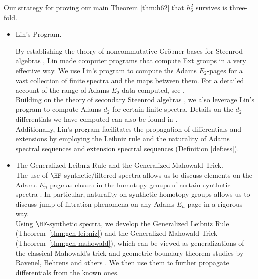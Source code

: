 Our strategy for proving our main Theorem \ref{thm:h62} that $h_6^2$ survives is three-fold. 

\begin{itemize}
    \item Lin's Program.

    \noindent By establishing the theory of noncommutative Gr\"obner bases for Steenrod algebras \cite{LinGrobner}, Lin made computer programs that compute Ext groups in a very effective way. We use Lin's program to compute the Adams $E_2$-pages for a vast collection of finite spectra and the maps between them. For a detailed account of the range of Adams $E_2$ data computed, see \cite{LWXMachine}.\\
    
    \noindent Building on the theory of secondary Steenrod algebras \cite{BJ, Nassau, Chua}, we also leverage Lin’s program to compute Adams $d_2$-for certain finite spectra. Details on the $d_2$-differentials we have computed can also be found in \cite{LWXMachine}.\\
    
    \noindent Additionally, Lin’s program facilitates the propagation of differentials and extensions by employing the Leibniz rule and the naturality of Adams spectral sequences and extension spectral sequences (Definition \ref{def:ess}). \\

    \item The Generalized Leibniz Rule and the Generalized Mahowald Trick. \\

    \noindent The use of $\HF$-synthetic/filtered spectra allows us to discuss elements on the Adams $E_n$-page as classes in the homotopy groups of certain synthetic spectra \cite{Pst, BurklundXu}. In particular, naturality on synthetic homotopy groups allows us to discuss jump-of-filtration phenomena on any Adams $E_n$-page in a rigorous way. \\
    
    \noindent Using $\HF$-synthetic spectra, we develop the Generalized Leibniz Rule (Theorem~\ref{thm:gen-leibniz}) and the Generalized Mahowald Trick (Theorem~\ref{thm:gen-mahowald}), which can be viewed as generalizations of the classical Mahowald's trick and geometric boundary theorem studies by Ravenel, Behrens and others \cite{RavenelGreenbook, Behrens, Ma, BurklundCookware}. We then use them to further propagate differentials from the known ones.\\


\end{itemize}

